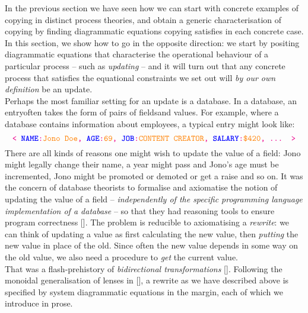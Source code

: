 In the previous section we have seen how we can start with concrete examples of copying in distinct process theories, and obtain a generic characterisation of copying by finding diagrammatic equations copying satisfies in each concrete case. In this section, we show how to go in the opposite direction: we start by positing diagrammatic equations that characterise the operational behaviour of a particular process -- such as \emph{updating} -- and it will turn out that any concrete process that satisfies the equational constraints we set out will \emph{by our own definition} be an update.\\

Perhaps the most familiar setting for an update is a database. In a database, an \bM entry\e often takes the form of pairs of \bB fields\e and \bO values\e. For example, where a database contains information about employees, a typical entry might look like:
\[\texttt{\bM < \bB\textbf{NAME}\e:\bO Jono Doe\e, \bB\textbf{AGE}\e:\bO 69\e, \bB\textbf{JOB}\e:\bO CONTENT CREATOR\e, \bB\textbf{SALARY}\e:\bO\$420\e, ... >\e}\]
There are all kinds of reasons one might wish to update the value of a field: Jono might legally change their name, a year might pass and Jono's age must be incremented, Jono might be promoted or demoted or get a raise and so on. It was the concern of database theorists to formalise and axiomatise the notion of updating the value of a field -- \emph{independently of the specific programming language implementation of a database} -- so that they had reasoning tools to ensure program correctness []. The problem is reducible to axiomatising a \emph{rewrite}: we can think of updating a value as first calculating the new value, then \emph{putting} the new value in place of the old. Since often the new value depends in some way on the old value, we also need a procedure to \emph{get} the current value.\\

That was a flash-prehistory of \emph{bidirectional transformations} []. Following the monoidal generalisation of lenses in [], a rewrite as we have described above is specified by system diagrammatic equations in the margin, each of which we introduce in prose.


